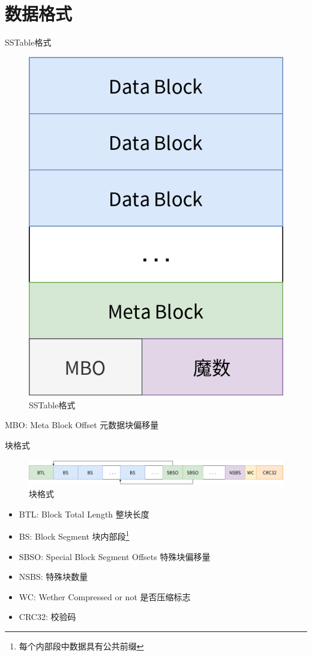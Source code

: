 \documentclass{beamer}
\begin{document}
\section{数据格式}

\begin{frame}{SSTable格式}
    \begin{figure}
        \centering
        \includegraphics[width=0.3\linewidth]{pic/SSTable.png}
        \caption{SSTable格式}
    \end{figure}
    MBO: Meta Block Offset 元数据块偏移量
\end{frame}

\begin{frame}{块格式}
    \begin{figure}
        \centering
        \includegraphics[width=1\linewidth]{pic/block.png}
        \caption{块格式}
    \end{figure}
    \begin{itemize}
        \item BTL: Block Total Length 整块长度
        \item BS: Block Segment 块内部段\footnote{每个内部段中数据具有公共前缀}
        \item SBSO: Special Block Segment Offsets 特殊块偏移量
        \item NSBS: 特殊块数量
        \item WC: Wether Compressed or not 是否压缩标志
        \item CRC32: 校验码
    \end{itemize}
\end{frame}
\end{document}
